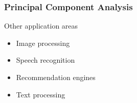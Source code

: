 \documentclass[12pt,a4paper,xcolor=dvipsnames,xcolor=table]{beamer}
\begin{document}
\begin{frame}[t]
    \frametitle{Principal Component Analysis}
    Other application areas
    \begin{itemize}
        \item Image processing
        \item Speech recognition
        \item Recommendation engines
        \item Text processing
    \end{itemize}

\end{frame}
\end{document}
